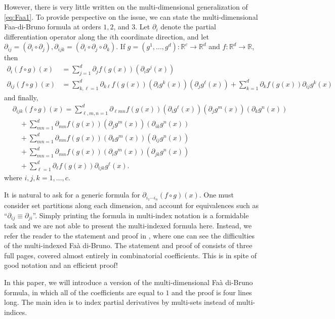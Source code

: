 \documentclass[12pt]{amsart}
\newcommand{\R}{\ensuremath{\mathbb{R}}}
\begin{document}
However, there is very little written on the multi-dimensional 
generalization of \eqref{eq:Faa1}.
To provide perspective on the issue, 
we can state the multi-dimensional
Faa-di-Bruno formula at orders $1,2$, and $3$.
Let $\partial_{i}$ denote the partial differentiation operator
along the $i$th coordinate direction,
and let $\partial_{ij} = (\partial_i \circ \partial_j), \partial_{ijk} = (\partial_i \circ \partial_j \circ \partial_k)$.
If $g = (g^1,\dots,g^d) : \R^c \to \R^d$ and $f:\R^d \to \R$, then
\begin{align*}
  \partial_i (f \circ g)(x) &= \sum_{j=1}^{d}\partial_jf(g(x)) 
  (\partial_i g^j(x)) \\
  \partial_{ij}(f \circ g)(x) &= \sum_{k,\ell = 1}^{d} \partial_{k\ell}f(g(x))
  (\partial_i g^k(x) ) (\partial_j g^{\ell}(x))
  + \sum_{k=1}^{d}\partial_k f(g(x)) \partial_{ij} g^k(x)
\end{align*}
and finally,
\begin{align*}
  &\partial_{ijk} (f \circ g)(x) = 
  \sum_{\ell,m,n=1}^{d} \partial_{\ell m n} f(g(x)) 
  (\partial_i g^\ell(x))  (\partial_j g^m(x))
  (\partial_k g^n(x)) \\
  &\quad + \sum_{mn=1}^{d} \partial_{mn}f(g(x))
  ( \partial_j g^m(x) )
  (\partial_{ik} g^n(x)) \\
  &\quad + \sum_{mn=1}^{d} \partial_{mn}f(g(x))
  ( \partial_k g^m(x) )
  (\partial_{ij} g^n(x)) \\
  &\quad + \sum_{mn=1}^{d} \partial_{mn}f(g(x))
  ( \partial_i g^m(x) )
  (\partial_{jk} g^n(x)) \\
  &\quad + \sum_{\ell=1}^{d} \partial_\ell f(g(x)) \partial_{ijk}g^\ell(x).
\end{align*}
where $i,j,k = 1,\dots,c$.

It is natural to ask for a generic formula for
$\partial_{i_1 \cdots i_n} (f \circ g)(x)$.
One must consider set partitions
along each dimension,
and account for equivalences such as
``$\partial_{ij} \equiv \partial_{ji}$''.
Simply printing the formula in multi-index
notation is a formidable task
and we are not able to present the multi-indexed formula here.
Instead, we refer the reader to the statement and proof in
 \cite{ConstantineSavits1996},
where one can see the difficulties of the multi-indexed Fa\`a di-Bruno.
The statement and proof of \cite{ConstantineSavits1996}
consists of three full pages, covered almost entirely in 
combinatorial coefficients.
This is in spite of good notation and an efficient proof!

In this paper, we will introduce a version of the multi-dimensional Fa\`a di-Bruno
formula, in which all of the coefficients are equal to $1$ and the proof is
 four lines long.
The main idea is to index partial derivatives by multi-sets
instead of multi-indices.
\end{document}
